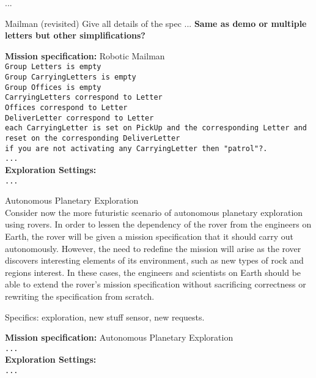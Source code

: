...

\begin{myExample}\label{Ex:mailman3} Mailman (revisited)
	Give all details of the spec ... \textbf{Same as demo or multiple letters but other simplifications?}
\end{myExample}

\begin{algorithm}
	\textbf{Mission specification:} Robotic Mailman\\
	{\small
	\texttt{Group Letters is empty}\\
	\texttt{Group CarryingLetters is empty}\\
	\texttt{Group Offices is empty}\\
	\texttt{CarryingLetters correspond to Letter}\\
	\texttt{Offices correspond to Letter}\\
	\texttt{DeliverLetter correspond to Letter}\\
	\texttt{each CarryingLetter is set on PickUp and the corresponding Letter and reset on the corresponding DeliverLetter}\\
	
	\texttt{if you are not activating any CarryingLetter then "patrol"?.}\\
	\texttt{...}\\
	}
	\textbf{Exploration Settings:}\\
	{\small
	\texttt{...} 
	}
\end{algorithm}

\begin{myExample}\label{Ex:planetxplore} Autonomous Planetary Exploration\\
	Consider now the more futuristic scenario of autonomous planetary exploration using rovers. In order to lessen the dependency of the rover from the engineers on Earth, the rover will be given a mission specification that it should carry out autonomously. However, the need to redefine the mission will arise as the rover discovers interesting elements of its environment, such as new types of rock and regions interest. In these cases, the engineers and scientists on Earth should be able to extend the rover's mission specification without sacrificing correctness or rewriting the specification from scratch.
	
	Specifics: exploration, new stuff sensor, new requests.
\end{myExample}

\begin{algorithm}
	\textbf{Mission specification:} Autonomous Planetary Exploration\\
	{\small
	\texttt{...}\\
	}
	\textbf{Exploration Settings:}\\
	{\small
	\texttt{...} 
	}
\end{algorithm}

